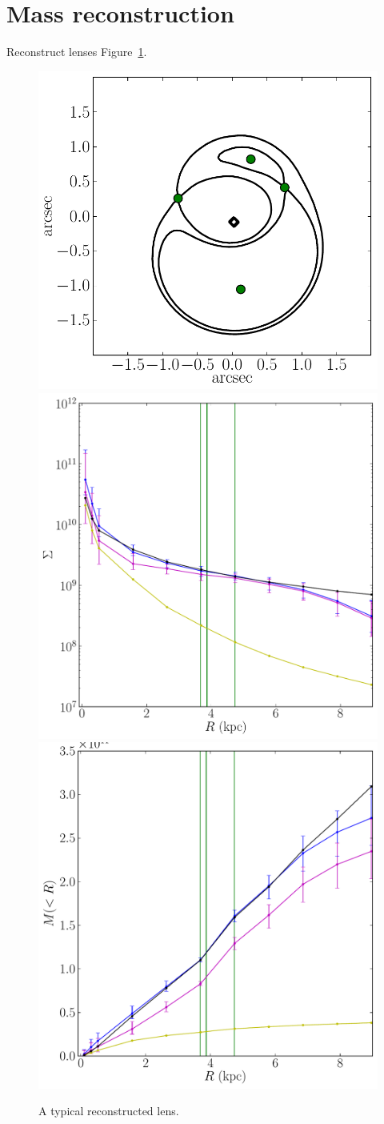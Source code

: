 \documentclass[usenatbib,onecolumn,galley]{mn2e}
\newcommand{\Glass}{{\sc Glass}}
\newcommand{\figref}[1] {Figure~\ref{#1}}
\begin{document}
\section{Mass reconstruction}

Reconstruct lenses \figref{reconstruction}.

\begin{figure}
\begin{center}
\includegraphics[width=.3\columnwidth]{BCQuadR1a_TmS-a.pdf}\hfil
\includegraphics[width=.3\columnwidth]{BCQuadR1a_TmS-b.pdf}\hfil
\includegraphics[width=.3\columnwidth]{BCQuadR1a_TmS-c.pdf}
\end{center}
\caption{A typical reconstructed lens.}
\label{reconstruction}
\end{figure}
\end{document}

